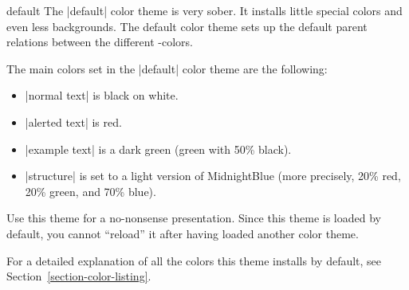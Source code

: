 \begin{colorthemeexample}{default}
  The |default| color theme is very sober. It installs little special
  colors and even less backgrounds. The default color theme sets up
  the default parent relations between the different \beamer-colors.

  The main colors set in the |default| color theme are the following: 
  \begin{itemize}
  \item
    |normal text| is black on white.
  \item
    |alerted text| is red.
  \item
    |example text| is a dark green (green with 50\% black).
  \item
    |structure| is set to a light version of MidnightBlue
    (more precisely, 20\% red, 20\% green, and 70\% blue).  
  \end{itemize}
  Use this theme for a no-nonsense presentation. Since this theme is
  loaded by default, you cannot ``reload'' it after having loaded
  another color theme.

  For a detailed explanation of all the colors this theme installs by
  default, see Section~\ref{section-color-listing}.
\end{colorthemeexample}

